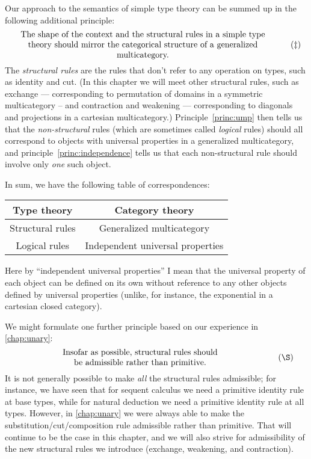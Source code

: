 \documentclass{book}
\begin{document}
Our approach to the semantics of simple type theory can be summed up in the following additional principle:
\begin{equation}\label{princ:structural}
  \parbox{4.3in}{\centering The shape of the context and the structural rules in a simple type theory should mirror the categorical structure of a generalized multicategory.}\tag{$\ddagger$}
\end{equation}
The \emph{structural rules} are the rules that don't refer to any operation on types, such as identity and cut.
(In this chapter we will meet other structural rules, such as exchange --- corresponding to permutation of domains in a symmetric multicategory -- and contraction and weakening --- corresponding to diagonals and projections in a cartesian multicategory.)
Principle~\eqref{princ:ump} then tells us that the \emph{non-structural} rules (which are sometimes called \emph{logical} rules) should all correspond to objects with universal properties in a generalized multicategory, and principle~\eqref{princ:independence} tells us that each non-structural rule should involve only \emph{one} such object.

In sum, we have the following table of correspondences:
\begin{center}
  \begin{tabular}{c|c}
    Type theory & Category theory\\\hline
    Structural rules & Generalized multicategory\\
    Logical rules & Independent universal properties
  \end{tabular}
\end{center}
Here by ``independent universal properties'' I mean that the universal property of each object can be defined on its own without reference to any other objects defined by universal properties (unlike, for instance, the exponential in a cartesian closed category).

We might formulate one further principle based on our experience in \cref{chap:unary}:
\begin{equation}\label{princ:adm}
  \parbox{4in}{\centering Insofar as possible, structural rules should\\ be admissible rather than primitive.}\tag{\S}
\end{equation}
It is not generally possible to make \emph{all} the structural rules admissible; for instance, we have seen that for sequent calculus we need a primitive identity rule at base types, while for natural deduction we need a primitive identity rule at all types.
However, in \cref{chap:unary} we were always able to make the substitution/cut/composition rule admissible rather than primitive.
That will continue to be the case in this chapter, and we will also strive for admissibility of the new structural rules we introduce (exchange, weakening, and contraction).
\end{document}
